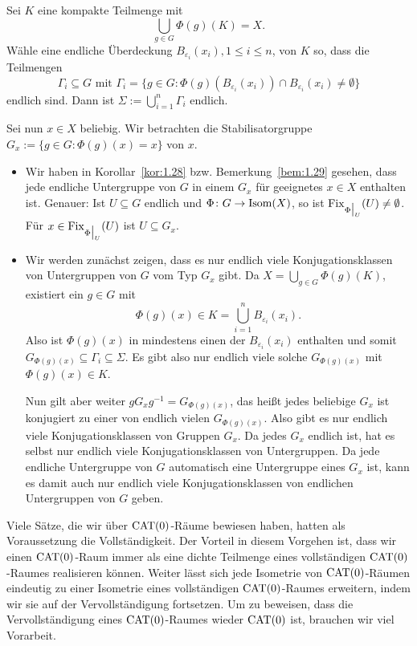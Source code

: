 \begin{beweis}
	Sei $K$ eine kompakte Teilmenge mit
	\[
		\bigcup_{g \in G} \Phi(g)(K) = X.
	\]
	Wähle eine endliche Überdeckung $B_{\varepsilon_i}(x_i), 1 \leq i \leq n$, von $K$ so, dass die Teilmengen
	\[
		\Gamma_i \subseteq G \text{ mit } \Gamma_i = \{g \in G : \Phi(g)(B_{\varepsilon_i}(x_i)) \cap B_{\varepsilon_i}(x_i) \neq \emptyset \}
	\]
	endlich sind.
	Dann ist $\Sigma := \bigcup_{i = 1}^n \Gamma_i$ endlich.
	
	Sei nun $x \in X$ beliebig.
	Wir betrachten die Stabilisatorgruppe $G_x := \{g \in G : \Phi(g)(x) = x\}$ von $x$.

	\begin{itemize}
		\item Wir haben in Korollar~\ref{kor:1.28} bzw. Bemerkung~\ref{bem:1.29} gesehen, dass jede endliche Untergruppe von $G$ in einem $G_x$ für geeignetes $x \in X$ enthalten ist.
		Genauer:
		Ist $U \subseteq G$ endlich und $\Phi \colon G \rightarrow \operatorname{Isom}(X)$, so ist $\operatorname{Fix}_{\Phi \big|_U}(U) \neq \emptyset$. Für $x \in \operatorname{Fix}_{\Phi \big|_U}(U)$ ist $U \subseteq G_x$.
		\item Wir werden zunächst zeigen, dass es nur endlich viele Konjugationsklassen von Untergruppen von $G$ vom Typ $G_x$ gibt.
		Da $X = \bigcup_{g \in G} \Phi(g)(K)$, existiert ein $g \in G$ mit 
		\[
			\Phi(g)(x) \in K = \bigcup_{i=1}^n B_{\varepsilon_i}(x_i).
		\]
		Also ist $\Phi(g)(x)$ in mindestens einen der $B_{\varepsilon_i}(x_i)$ enthalten und somit $G_{\Phi(g)(x)} \subseteq \Gamma_i \subseteq \Sigma$. Es gibt also nur endlich viele solche $G_{\Phi(g)(x)}$ mit $\Phi(g)(x) \in K$.
		
		Nun gilt aber weiter $g G_x g^{-1} = G_{\Phi(g)(x)}$, das heißt jedes beliebige $G_x$ ist konjugiert zu einer von endlich vielen $G_{\Phi(g)(x)}$.
		Also gibt es nur endlich viele Konjugationsklassen von Gruppen $G_x$.
		Da jedes $G_x$ endlich ist, hat es selbst nur endlich viele Konjugationsklassen von Untergruppen.
		Da jede endliche Untergruppe von $G$ automatisch eine Untergruppe eines $G_x$ ist, kann es damit auch nur endlich viele Konjugationsklassen von endlichen Untergruppen von $G$ geben. 
	\end{itemize}
\end{beweis}

Viele Sätze, die wir über $\operatorname{CAT(0)}$-Räume bewiesen haben, hatten als Voraussetzung die Vollständigkeit.
Der Vorteil in diesem Vorgehen ist, dass wir einen $\operatorname{CAT(0)}$-Raum immer als eine dichte Teilmenge eines vollständigen $\operatorname{CAT(0)}$-Raumes realisieren können.
Weiter lässt sich jede Isometrie von $\operatorname{CAT(0)}$-Räumen eindeutig zu einer Isometrie eines vollständigen $\operatorname{CAT(0)}$-Raumes erweitern, indem wir sie auf der Vervollständigung fortsetzen.
Um zu beweisen, dass die Vervollständigung eines $\operatorname{CAT(0)}$-Raumes wieder $\operatorname{CAT(0)}$ ist, brauchen wir viel Vorarbeit.

